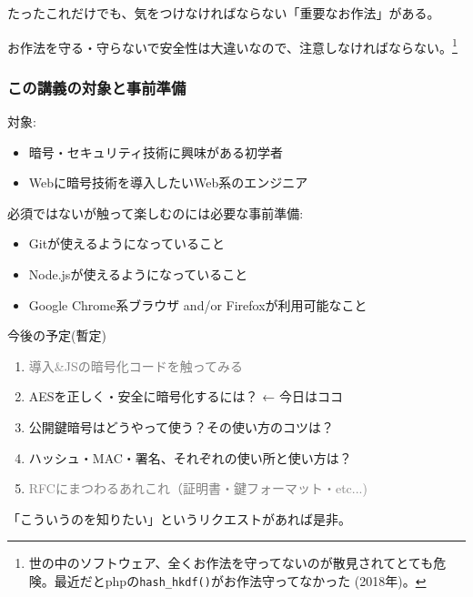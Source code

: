\documentclass[12pt,dvipdfmx]{beamer}
\begin{document}
\begin{frame}

たったこれだけでも、気をつけなければならない\alert{「重要なお作法」}がある。

\vspace{2ex}

\alert{お作法を守る・守らないで安全性は大違い}なので、注意しなければならない。\footnote[frame]{世の中のソフトウェア、全くお作法を守ってないのが散見されてとても危険。最近だとphpの\texttt{hash\_hkdf()}がお作法守ってなかった (2018年)。}
\end{frame}



\begin{frame}
\frametitle{この講義の対象と事前準備}
対象:
\begin{itemize}
\item 暗号・セキュリティ技術に興味がある初学者
\item Webに暗号技術を導入したいWeb系のエンジニア
\end{itemize}

\vspace{2ex}

必須ではないが触って楽しむのには必要な事前準備:
\begin{itemize}
\item Gitが使えるようになっていること
\item Node.jsが使えるようになっていること
\item Google Chrome系ブラウザ and/or Firefoxが利用可能なこと
\end{itemize}
\end{frame}


\begin{frame}
今後の予定(暫定)
\begin{enumerate}
 \item \textcolor{gray}{導入\&JSの暗号化コードを触ってみる}
 \item \alert{AESを正しく・安全に暗号化するには？} ← 今日はココ
 \item 公開鍵暗号はどうやって使う？その使い方のコツは？
 \item ハッシュ・MAC・署名、それぞれの使い所と使い方は？
 \item \textcolor{gray}{RFCにまつわるあれこれ（証明書・鍵フォーマット・etc...)}
\end{enumerate}
「こういうのを知りたい」というリクエストがあれば是非。
\end{frame}

\end{document}
